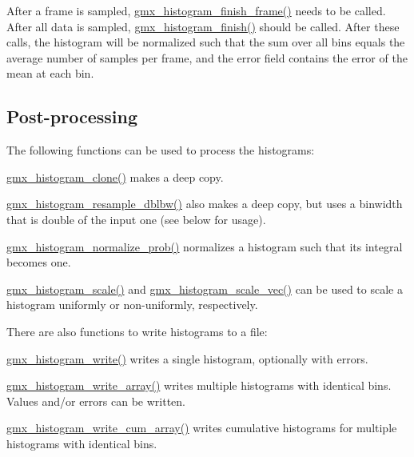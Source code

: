 \-After a frame is sampled, \hyperlink{include_2histogram_8h_af2e121043fcfe67917ef4abff2c3d1b3}{gmx\-\_\-histogram\-\_\-finish\-\_\-frame()} needs to be called. \-After all data is sampled, \hyperlink{include_2histogram_8h_a914cda7c09870610bcb3a83ac52cc709}{gmx\-\_\-histogram\-\_\-finish()} should be called. \-After these calls, the histogram will be normalized such that the sum over all bins equals the average number of samples per frame, and the error field contains the error of the mean at each bin.\hypertarget{histograms_histogram_processing}{}\subsection{\-Post-\/processing}\label{histograms_histogram_processing}
\-The following functions can be used to process the histograms\-:
\begin{DoxyItemize}
\item \hyperlink{include_2histogram_8h_ac5a1bb4ae8fe959b88bc14fdaa18ceb7}{gmx\-\_\-histogram\-\_\-clone()} makes a deep copy.
\item \hyperlink{include_2histogram_8h_a93a4debed53d9956228209842abfce40}{gmx\-\_\-histogram\-\_\-resample\-\_\-dblbw()} also makes a deep copy, but uses a binwidth that is double of the input one (see below for usage).
\item \hyperlink{include_2histogram_8h_a7f22f213dda945f913b246bb6ab32556}{gmx\-\_\-histogram\-\_\-normalize\-\_\-prob()} normalizes a histogram such that its integral becomes one.
\item \hyperlink{include_2histogram_8h_a28bbd3fc76c889ae19abb003a81bccf2}{gmx\-\_\-histogram\-\_\-scale()} and \hyperlink{include_2histogram_8h_a918cbf6887a3ad0c077d44cbcecf5454}{gmx\-\_\-histogram\-\_\-scale\-\_\-vec()} can be used to scale a histogram uniformly or non-\/uniformly, respectively.
\end{DoxyItemize}

\-There are also functions to write histograms to a file\-:
\begin{DoxyItemize}
\item \hyperlink{include_2histogram_8h_a8afcdc28d6c3e45b4d0dde85f11bdd04}{gmx\-\_\-histogram\-\_\-write()} writes a single histogram, optionally with errors.
\item \hyperlink{include_2histogram_8h_adf8c712ada3fc9147cd90ddd8ea79f28}{gmx\-\_\-histogram\-\_\-write\-\_\-array()} writes multiple histograms with identical bins. \-Values and/or errors can be written.
\item \hyperlink{include_2histogram_8h_a4064bbd1c5338583f652e8f9aee24c14}{gmx\-\_\-histogram\-\_\-write\-\_\-cum\-\_\-array()} writes cumulative histograms for multiple histograms with identical bins.
\end{DoxyItemize}


